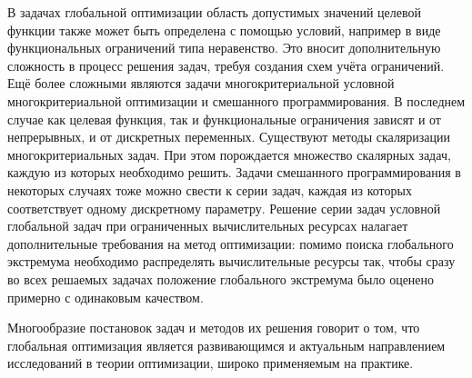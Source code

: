 В задачах глобальной оптимизации область допустимых значений целевой функции также может быть определена
с помощью условий, например в виде функциональных ограничений типа неравенство. Это вносит дополнительную сложность в процесс решения
задач, требуя создания схем учёта ограничений. Ещё более сложными являются задачи многокритериальной условной многокритериальной
оптимизации и смешанного программирования. В последнем случае как целевая функция, так и функциональные ограничения
зависят и от непрерывных, и от дискретных переменных. Существуют методы скаляризации многокритериальных задач.
При этом порождается множество скалярных задач, каждую из которых необходимо решить. Задачи смешанного программирования
в некоторых случаях тоже можно свести к серии задач, каждая из которых соответствует одному дискретному параметру.
Решение серии задач условной глобальной задач при ограниченных вычислительных
ресурсах налагает дополнительные требования на метод оптимизации: помимо поиска глобального экстремума необходимо
распределять вычислительные ресурсы так, чтобы сразу во всех решаемых задачах положение глобального
экстремума было оценено примерно с одинаковым качеством.

Многообразие постановок задач и методов их решения говорит о том, что глобальная оптимизация
является развивающимся и актуальным направлением исследований в теории оптимизации, широко применяемым на практике.






